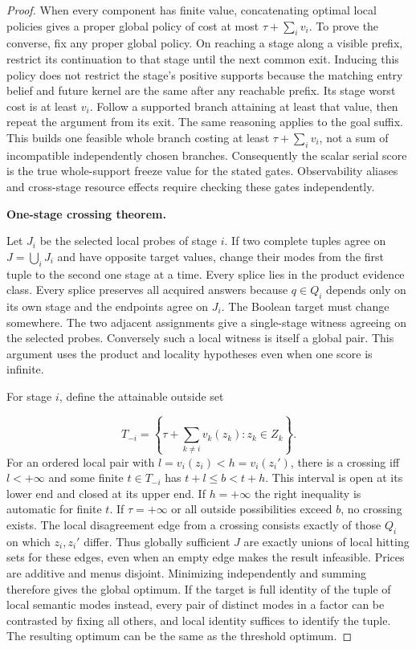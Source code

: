 \begin{proof}
When every component has finite value, concatenating optimal local policies gives a proper global policy of cost at most \(\tau+\sum_i v_i\). To prove the converse, fix any proper global policy. On reaching a stage along a visible prefix, restrict its continuation to that stage until the next common exit. Inducing this policy does not restrict the stage's positive supports because the matching entry belief and future kernel are the same after any reachable prefix. Its stage worst cost is at least \(v_i\). Follow a supported branch attaining at least that value, then repeat the argument from its exit. The same reasoning applies to the goal suffix. This builds one feasible whole branch costing at least \(\tau+\sum_i v_i\), not a sum of incompatible independently chosen branches. Consequently the scalar serial score is the true whole-support freeze value for the stated gates. Observability aliases and cross-stage resource effects require checking these gates independently.

\textbf{One-stage crossing theorem.}

Let \(J_i\) be the selected local probes of stage \(i\). If two complete tuples agree on \(J=\bigcup_iJ_i\) and have opposite target values, change their modes from the first tuple to the second one stage at a time. Every splice lies in the product evidence class. Every splice preserves all acquired answers because \(q\in Q_i\) depends only on its own stage and the endpoints agree on \(J_i\). The Boolean target must change somewhere. The two adjacent assignments give a single-stage witness agreeing on the selected probes. Conversely such a local witness is itself a global pair. This argument uses the product and locality hypotheses even when one score is infinite.

For stage \(i\), define the attainable outside set

\[
T_{-i}=\left\{\tau+\sum_{k\ne i}v_k(z_k): z_k\in Z_k\right\}.
\]
For an ordered local pair with \(l=v_i(z_i)<h=v_i(z_i')\), there is a crossing iff \(l<+\infty\) and some finite \(t\in T_{-i}\) has \(t+l\le b<t+h\). This interval is open at its lower end and closed at its upper end. If \(h=+\infty\) the right inequality is automatic for finite \(t\). If \(\tau=+\infty\) or all outside possibilities exceed \(b\), no crossing exists. The local disagreement edge from a crossing consists exactly of those \(Q_i\) on which \(z_i,z_i'\) differ. Thus globally sufficient \(J\) are exactly unions of local hitting sets for these edges, even when an empty edge makes the result infeasible. Prices are additive and menus disjoint. Minimizing independently and summing therefore gives the global optimum. If the target is full identity of the tuple of local semantic modes instead, every pair of distinct modes in a factor can be contrasted by fixing all others, and local identity suffices to identify the tuple. The resulting optimum can be the same as the threshold optimum.


\end{proof}
